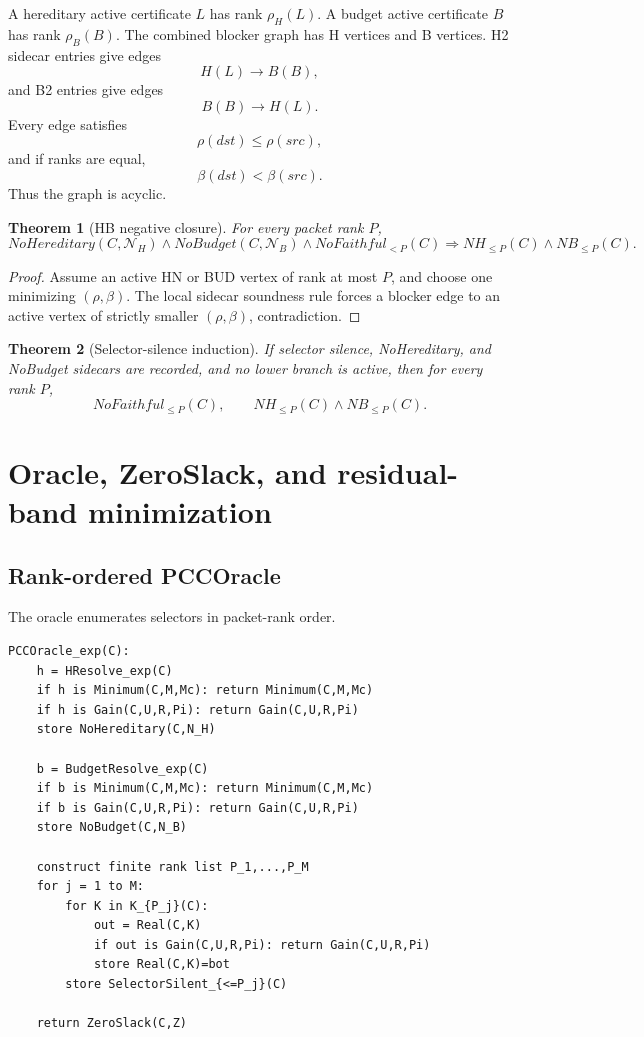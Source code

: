 \documentclass[10.5pt,a4paper]{article}
\newtheorem{theorem}{Theorem}[section]
\begin{document}
A hereditary active certificate \(L\) has rank \(\rho_H(L)\). A budget active certificate \(B\) has rank \(\rho_B(B)\). The combined blocker graph has H vertices and B vertices. H2 sidecar entries give edges
\[
H(L)\to B(B),
\]
and B2 entries give edges
\[
B(B)\to H(L).
\]
Every edge satisfies
\[
\rho(dst)\le \rho(src),
\]
and if ranks are equal,
\[
\beta(dst)<\beta(src).
\]
Thus the graph is acyclic.

\begin{theorem}[HB negative closure]
For every packet rank \(P\),
\[
NoHereditary(C,\mathcal N_H)\wedge NoBudget(C,\mathcal N_B)\wedge NoFaithful_{<P}(C)
\Longrightarrow
NH_{\le P}(C)\wedge NB_{\le P}(C).
\]
\end{theorem}

\begin{proof}
Assume an active HN or BUD vertex of rank at most \(P\), and choose one minimizing \((\rho,\beta)\). The local sidecar soundness rule forces a blocker edge to an active vertex of strictly smaller \((\rho,\beta)\), contradiction.
\end{proof}

\begin{theorem}[Selector-silence induction]
If selector silence, NoHereditary, and NoBudget sidecars are recorded, and no lower branch is active, then for every rank \(P\),
\[
NoFaithful_{\le P}(C),
\qquad
NH_{\le P}(C)\wedge NB_{\le P}(C).
\]
\end{theorem}

\section{Oracle, ZeroSlack, and residual-band minimization}

\subsection{Rank-ordered PCCOracle}
The oracle enumerates selectors in packet-rank order.

\begin{lstlisting}
PCCOracle_exp(C):
    h = HResolve_exp(C)
    if h is Minimum(C,M,Mc): return Minimum(C,M,Mc)
    if h is Gain(C,U,R,Pi): return Gain(C,U,R,Pi)
    store NoHereditary(C,N_H)

    b = BudgetResolve_exp(C)
    if b is Minimum(C,M,Mc): return Minimum(C,M,Mc)
    if b is Gain(C,U,R,Pi): return Gain(C,U,R,Pi)
    store NoBudget(C,N_B)

    construct finite rank list P_1,...,P_M
    for j = 1 to M:
        for K in K_{P_j}(C):
            out = Real(C,K)
            if out is Gain(C,U,R,Pi): return Gain(C,U,R,Pi)
            store Real(C,K)=bot
        store SelectorSilent_{<=P_j}(C)

    return ZeroSlack(C,Z)
\end{lstlisting}
\end{document}
